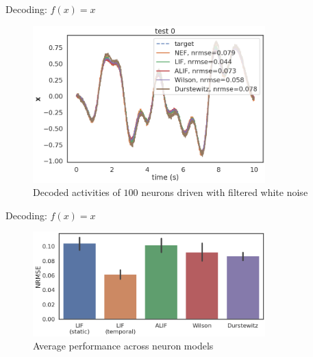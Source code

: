 \documentclass[aspectratio=169]{beamer}
\begin{document}
\begin{frame}{Decoding: $f(x) = x$}
\begin{figure}
    \centering
    \includegraphics[width=0.8\textwidth]{media/feedforward_test0_order1.png}
    \caption{Decoded activities of $100$ neurons driven with filtered white noise}
\end{figure}
\end{frame}
\begin{frame}{Decoding: $f(x) = x$}
\begin{figure}
    \centering
    \includegraphics[width=0.8\textwidth]{media/feedforward_barplots_order1.png}
    \caption{Average performance across neuron models}
\end{figure}
\end{frame}
\end{document}
